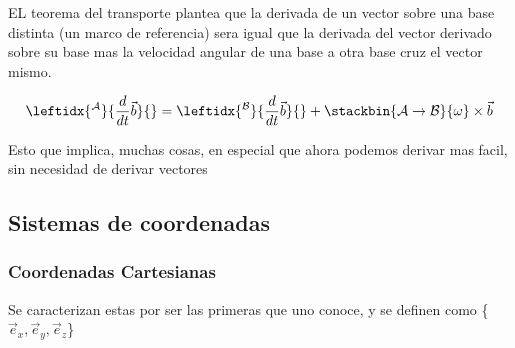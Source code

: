 EL teorema del transporte plantea que la derivada de un vector sobre una base distinta (un marco de referencia) sera igual que la derivada del vector derivado sobre su base mas la velocidad angular de una base a otra base cruz el vector mismo.

$$\leftidx{^\mathcal{A}}{\dfrac{d}{dt}\Vec{b}}{}=\leftidx{^\mathcal{B}}{\dfrac{d}{dt}\Vec{b}}{}+\stackbin{\mathcal{A}\to \mathcal{B}}{\omega}\times \Vec{b}$$

Esto que implica, muchas cosas, en especial que ahora podemos derivar mas facil, sin necesidad de derivar vectores


\subsection{Sistemas de coordenadas}
\subsubsection{Coordenadas Cartesianas}
Se caracterizan estas por ser las primeras que uno conoce, y se definen como \{$\Vec{e}_x,\Vec{e}_y,\vec{e}_z$\}

